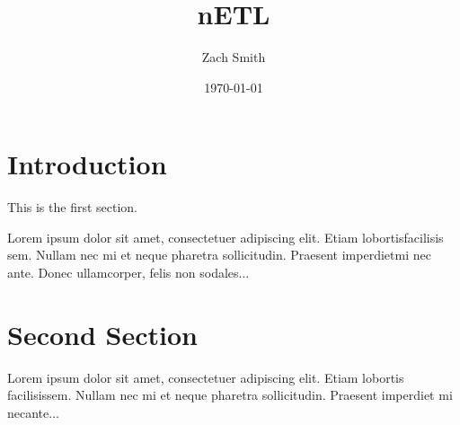 \documentclass{article}
\title{nETL}
\author{Zach Smith}
\date{\today}
\begin{document}
\maketitle

\section{Introduction}

This is the first section.

Lorem  ipsum  dolor  sit  amet,  consectetuer  adipiscing
elit.   Etiam  lobortisfacilisis sem.  Nullam nec mi et
neque pharetra sollicitudin.  Praesent imperdietmi nec ante.
Donec ullamcorper, felis non sodales...

\section{Second Section}

Lorem ipsum dolor sit amet, consectetuer adipiscing elit.
Etiam lobortis facilisissem.  Nullam nec mi et neque pharetra
sollicitudin.  Praesent imperdiet mi necante...
\end{document}
